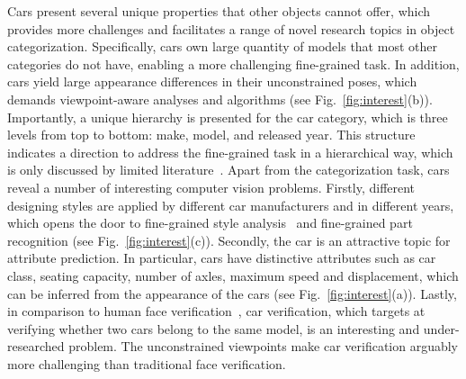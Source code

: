 \documentclass[10pt,twocolumn,letterpaper]{article}
\begin{document}
Cars present several unique properties that other objects cannot offer, which provides more challenges and facilitates a range of novel research topics in object categorization.
%
Specifically, cars own large quantity of models that most other categories do not have, enabling a more challenging fine-grained task.
%
In addition, cars yield large appearance differences in their unconstrained poses, which demands viewpoint-aware analyses and algorithms (see Fig.~\ref{fig:interest}(b)).
%
Importantly, a unique hierarchy is presented for the car category, which is three levels from top to bottom: make, model, and released year. This structure indicates a direction to address the fine-grained task in a hierarchical way, which is only discussed by limited literature~\cite{Maji13}.
%
Apart from the categorization task, cars reveal a number of interesting computer vision problems.
%
Firstly, different designing styles are applied by different car manufacturers and in different years, which opens the door to fine-grained style analysis~\cite{Lee13style} and fine-grained part recognition (see Fig.~\ref{fig:interest}(c)).
%
Secondly, the car is an attractive topic for attribute prediction. In particular, cars have distinctive attributes such as car class, seating capacity, number of axles, maximum speed and displacement, which can be inferred from the appearance of the cars (see Fig.~\ref{fig:interest}(a)).
%
Lastly, in comparison to human face verification~\cite{Sun14}, car verification, which targets at verifying whether two cars belong to the same model, is an interesting and under-researched problem. The unconstrained viewpoints make car verification arguably more challenging than traditional face verification.


\end{document}
